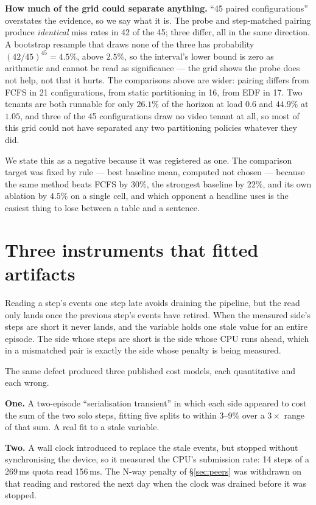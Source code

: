 \documentclass[sigconf,nonacm]{acmart}
\begin{document}
\textbf{How much of the grid could separate anything.} ``45 paired
configurations'' overstates the evidence, so we say what it is. The
probe and step-matched pairing produce \emph{identical} miss rates in 42
of the 45; three differ, all in the same direction. A bootstrap resample
that draws none of the three has probability $(42/45)^{45}=4.5\%$, above
$2.5\%$, so the interval's lower bound is zero as arithmetic and cannot
be read as significance --- the grid shows the probe does not help, not
that it hurts. The comparisons above are wider: pairing differs from
FCFS in 21 configurations, from static partitioning in 16, from EDF in
17. Two tenants are both runnable for only $26.1\%$ of the horizon at
load $0.6$ and $44.9\%$ at $1.05$, and three of the 45 configurations
draw no video tenant at all, so most of this grid could not have
separated any two partitioning policies whatever they did.

We state this as a negative because it was registered as one. The
comparison target was fixed by rule --- best baseline mean, computed not
chosen --- because the same method beats FCFS by $30\%$, the strongest
baseline by $22\%$, and its own ablation by $4.5\%$ on a single cell, and
which opponent a headline uses is the easiest thing to lose between a
table and a sentence.

\section{Three instruments that fitted artifacts}
\label{sec:method}

Reading a step's events one step late avoids draining the pipeline, but
the read only lands once the previous step's events have retired. When
the measured side's steps are short it never lands, and the variable
holds one stale value for an entire episode. The side whose steps are
short is the side whose CPU runs ahead, which in a mismatched pair is
exactly the side whose penalty is being measured.

The same defect produced three published cost models, each quantitative
and each wrong.

\textbf{One.} A two-episode ``serialisation transient'' in which each
side appeared to cost the sum of the two solo steps, fitting five splits
to within 3--9\% over a $3\times$ range of that sum. A real fit to a
stale variable.

\textbf{Two.} A wall clock introduced to replace the stale events, but
stopped without synchronising the device, so it measured the CPU's
submission rate: 14 steps of a 269\,ms quota read 156\,ms. The N-way
penalty of \S\ref{sec:peers} was withdrawn on that reading and restored
the next day when the clock was drained before it was stopped.
\end{document}
